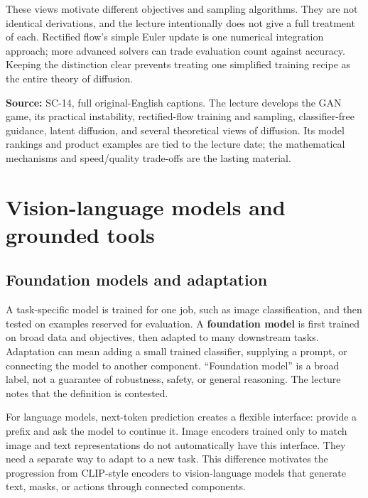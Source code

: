These views motivate different objectives and sampling algorithms. They are not identical derivations, and the lecture intentionally does not give a full treatment of each. Rectified flow's simple Euler update is one numerical integration approach; more advanced solvers can trade evaluation count against accuracy. Keeping the distinction clear prevents treating one simplified training recipe as the entire theory of diffusion.

\textbf{Source:} SC-14, full original-English captions. The lecture develops the GAN game, its practical instability, rectified-flow training and sampling, classifier-free guidance, latent diffusion, and several theoretical views of diffusion. Its model rankings and product examples are tied to the lecture date; the mathematical mechanisms and speed/quality trade-offs are the lasting material.

\section{Vision-language models and grounded tools}\label{04-visual-computing-ii-ch031-vision-language-models-and-grounded-tools}

\hypertarget{04-visual-computing-ii-ch031-vision-language-models-and-grounded-tools}{}

\subsection{Foundation models and adaptation}\label{04-visual-computing-ii-ch031-foundation-models-and-adaptation}

\hypertarget{04-visual-computing-ii-ch031-foundation-models-and-adaptation}{}

A task-specific model is trained for one job, such as image classification, and then tested on examples reserved for evaluation. A \textbf{foundation model} is first trained on broad data and objectives, then adapted to many downstream tasks. Adaptation can mean adding a small trained classifier, supplying a prompt, or connecting the model to another component. ``Foundation model'' is a broad label, not a guarantee of robustness, safety, or general reasoning. The lecture notes that the definition is contested.

For language models, next-token prediction creates a flexible interface: provide a prefix and ask the model to continue it. Image encoders trained only to match image and text representations do not automatically have this interface. They need a separate way to adapt to a new task. This difference motivates the progression from CLIP-style encoders to vision-language models that generate text, masks, or actions through connected components.

